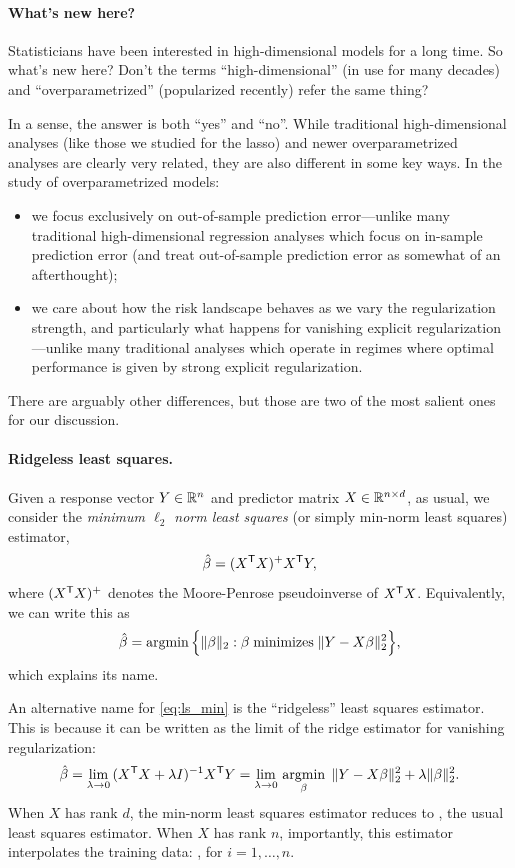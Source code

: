 \documentclass{article}
\begin{document}
\paragraph{What's new here?}

Statisticians have been interested in high-dimensional models for a long
time. So what's new here? Don't the terms ``high-dimensional'' (in use for many
decades) and ``overparametrized'' (popularized recently) refer the same thing?  

In a sense, the answer is both ``yes'' and ``no''. While traditional
high-dimensional analyses (like those we studied for the lasso) and newer
overparametrized analyses are clearly very related, they are also different in
some key ways. In the study of overparametrized models:
\begin{itemize}
\item we focus exclusively on out-of-sample prediction error---unlike many 
  traditional high-dimensional regression analyses which focus on in-sample
  prediction error (and treat out-of-sample prediction error as somewhat of an 
  afterthought);  
\item we care about how the risk landscape behaves as we vary the regularization  
  strength, and particularly what happens for vanishing explicit
  regularization---unlike many traditional analyses which operate in regimes
  where optimal performance is given by strong explicit regularization.  
\end{itemize}
There are arguably other differences, but those are two of the most salient ones 
for our discussion.

\paragraph{Ridgeless least squares.}

Given a response vector $Y \in \mathbb{R}^n$ and predictor matrix $X \in \mathbb{R}^{n \times
  d}$, as usual, we consider the \emph{minimum $\ell_2$ norm least squares} 
(or simply min-norm least squares) estimator,
\begin{equation}
\label{eq:ls_min}
\hat{\beta} = (X^{\mathsf{T}} X)^+ X^{\mathsf{T}} Y,
\end{equation}
where $(X^{\mathsf{T}} X)^+$ denotes the Moore-Penrose pseudoinverse of $X^{\mathsf{T}} X$.
Equivalently, we can write this as
\[
\hat{\beta} = \mathop{\mathrm{argmin}} \Big\{ \|\beta\|_2 : \beta \; \text{minimizes} \; \|Y - X
\beta\|_2^2 \Big\},   
\]
which explains its name.  

An alternative name for \eqref{eq:ls_min} is the ``ridgeless'' least squares
estimator. This is because it can be written as the limit of the ridge estimator
for vanishing regularization:  
\[
\hat{\beta} = \lim_{\lambda \to 0} \, (X^{\mathsf{T}} X + \lambda I)^{-1} X^{\mathsf{T}} Y =   
\lim_{\lambda \to 0} \, \mathop{\mathrm{argmin}}_\beta \; \|Y - X\beta\|_2^2 + \lambda 
\|\beta\|_2^2.   
\]
When $X$ has rank $d$, the min-norm least squares estimator reduces to
, the usual least squares estimator.
When $X$ has rank $n$, importantly, this estimator interpolates the training
data: , for $i=1,\dots,n$.  
\end{document}
